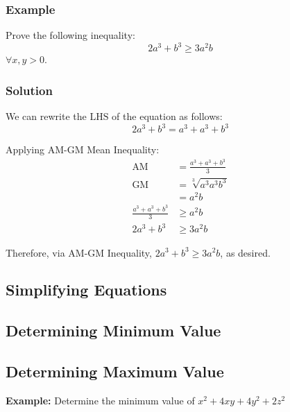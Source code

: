 \documentclass[12pt]{article}
\begin{document}
\subsubsection*{Example}
Prove the following inequality: $$2a^3 + b^3 \geq 3a^2b$$ $\forall x, y > 0$.

\subsubsection*{Solution}
We can rewrite the $\text{LHS}$ of the equation as follows: $$2a^3 + b^3 = a^3 + a^3 + b^3$$

Applying AM-GM Mean Inequality:
\begin{align*}
    \text{AM} &= \frac{a^3 + a^3 + b^3}{3} \\
    \text{GM} &= \sqrt[3]{a^3 a^3 b^3} \\
              &= a^2 b \\
  \frac{a^3 + a^3 + b^3}{3} &\geq a^2 b \\
  2a^3 + b^3 &\geq 3a^2 b
\end{align*} 

Therefore, via AM-GM Inequality, $2a^3 + b^3 \geq 3a^2 b$, as desired.

\subsection{Simplifying Equations}


\subsection{Determining Minimum Value}
\subsection{Determining Maximum Value}
\textbf{Example:} Determine the minimum value of $x^2 + 4xy + 4y^2 + 2z^2$
\end{document}
